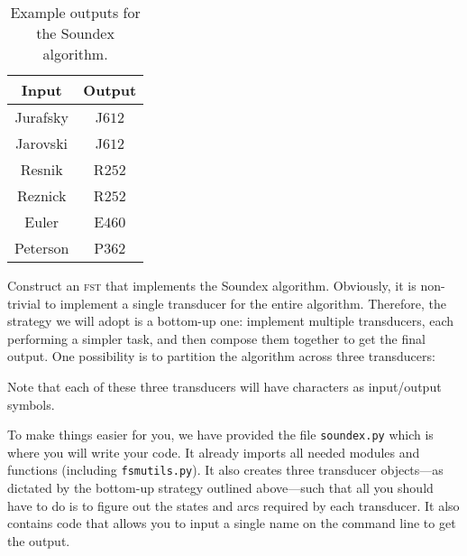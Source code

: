 \documentclass[11pt,letterpaper]{article}
\begin{document}
\begin{table}[htbp]
	\begin{center}
		\begin{tabular}{|c|c|}
			\hline
			\textbf{Input} & \textbf{Output} \\ \hline \hline
			Jurafsky & J$612$ \\ \hline
			Jarovski & J$612$ \\ \hline
			Resnik & R$252$ \\ \hline
			Reznick & R$252$ \\ \hline
			Euler & E$460$ \\ \hline
			Peterson & P$362$ \\ \hline
			\end{tabular}
		\caption{Example outputs for the Soundex algorithm.}\label{tbl:soundex}
\end{center}
\end{table}

 Construct an \textsc{fst} that implements the Soundex
 algorithm. Obviously, it is non-trivial to implement a single
 transducer for the entire algorithm. Therefore, the strategy we will
 adopt is a bottom-up one: implement multiple transducers, each
 performing a simpler task, and then compose them together to get the
 final output. One possibility is to partition the algorithm across
 three transducers:
 Note that each of these three transducers will have characters as
 input/output symbols.  

 To make things easier for you, we have provided the file
 \texttt{soundex.py} which is where you will write your code. It
 already imports all needed modules and functions (including
 \texttt{fsmutils.py}). It also creates three transducer objects---as
 dictated by the bottom-up strategy outlined above---such that all you
 should have to do is to figure out the states and arcs required by
 each transducer. It also contains code that allows you to input a
 single name on the command line to get the output.
\end{document}

